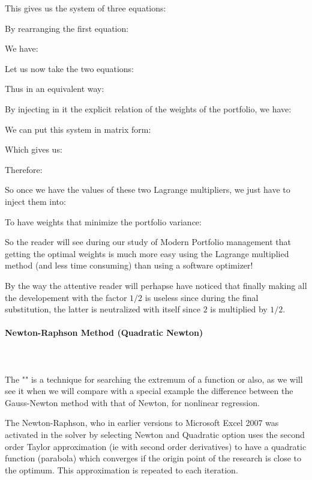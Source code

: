 	This gives us the system of three equations:
	  
	By rearranging the first equation:
	 
 	We have:
	 
 	Let us now take the two equations:
	
	Thus in an equivalent way:
	
	By injecting in it the explicit relation of the weights of the portfolio, we have:
	
	We can put this system in matrix form:
	
	Which gives us:
	
	Therefore:
	
	So once we have the values of these two Lagrange multipliers, we just have to inject them into:
	
 	To have weights that minimize the portfolio variance:
	
	So the reader will see during our study of Modern Portfolio management that getting the optimal weights is much more easy using the Lagrange multiplied method (and less time consuming) than using a software optimizer!
	\begin{tcolorbox}[title=Remark,colframe=black,arc=10pt]
	By the way the attentive reader will perhapse have noticed that finally making all the developement with the factor $1/2$ is useless since during the final substitution, the latter is neutralized with itself since $2$ is multiplied by $1/2$.
	\end{tcolorbox}
	
	\pagebreak
	\paragraph{Newton-Raphson Method (Quadratic Newton)}\mbox{}\\\\
	The "" is a technique for searching the extremum of a function or also, as we will see it when we will compare with a special example the difference between the Gauss-Newton method with that of Newton, for nonlinear regression.

	The Newton-Raphson, who in earlier versions to Microsoft Excel 2007 was activated in the solver by selecting Newton and Quadratic option uses the second order Taylor approximation (ie with second order derivatives) to have a quadratic function (parabola) which converges if the origin point of the research is close to the optimum. This approximation is repeated to each iteration.

